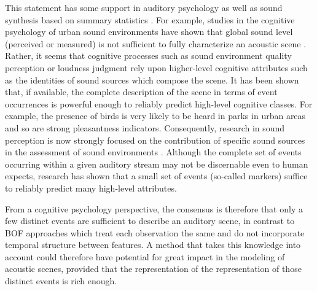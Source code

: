 \documentclass[smallextended]{svjour3}
\begin{document}
This statement has some support in auditory psychology as well as sound synthesis based on summary statistics \cite{mcdermott2013summary}. For example, studies in the cognitive psychology of urban sound environments have shown that global sound level (perceived or measured) is not sufficient to fully characterize an acoustic scene \cite{guyot2005urban,kang2006urban}. Rather, it seems that cognitive processes such as sound environment quality perception \cite{dubois2006cognitive} or loudness judgment \cite{kuwano_memory_2003} rely upon higher-level cognitive attributes such as the identities of sound sources which compose the scene. It has been shown that, if available, the complete description of the scene in terms of event occurrences is powerful enough to reliably predict high-level cognitive classes. For example, the presence of birds is very likely to be heard in parks in urban areas and so are strong pleasantness indicators. Consequently, research in sound perception is now strongly focused on the contribution of specific sound sources in the assessment of sound environments \cite{ricciardi2015sound,lavandier2006contribution}. Although the complete set of events occurring within a given auditory stream may not be discernable even to human expects, research has shown that a small set of events (so-called markers) suffice to reliably predict many high-level attributes.

From a cognitive psychology perspective, the consensus is therefore that only a few distinct events are sufficient to describe an auditory scene, in contrast to BOF approaches which treat each observation the same and do not incorporate temporal structure between features. A method that takes this knowledge into account could therefore have potential for great impact in the modeling of acoustic scenes, provided that the representation of the representation of those distinct events is rich enough.

\end{document}
